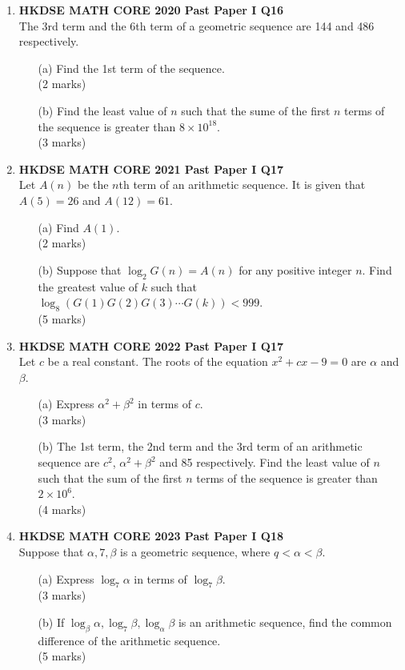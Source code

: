 \documentclass[12pt]{article}
\begin{document}
\begin{enumerate}
    \item \textbf{HKDSE MATH CORE 2020 Past Paper I Q16}\\
	The 3rd term and the 6th term of a geometric sequence are 144 and 486 respectively.
	\begin{enumerate}
		\item[(a)] Find the 1st term of the sequence. \\(2 marks) 
		\item[(b)] Find the least value of $n$ such that the sume of the first $n$ terms of the sequence is greater than $8 \times 10^{18}$. \\(3 marks)
	\end{enumerate}

    \item \textbf{HKDSE MATH CORE 2021 Past Paper I Q17}\\
	Let $A(n)$ be the $n$th term of an arithmetic sequence. It is given that $A(5) = 26$ and $A(12) = 61$.
	\begin{enumerate}
		\item[(a)] Find $A(1)$. \\(2 marks)
		\item[(b)] Suppose that $\log_2{G(n)} = A(n)$ for any positive integer $n$. Find the greatest value of $k$ such that $\log_8{\left(G(1)G(2)G(3)\cdots G(k)\right) < 999}$. \\(5 marks)
	\end{enumerate}

    \item \textbf{HKDSE MATH CORE 2022 Past Paper I Q17}\\
	Let $c$ be a real constant. The roots of the equation $x^2 + cx - 9 = 0$ are $\alpha$ and $\beta$.
	\begin{enumerate}
		\item[(a)] Express $\alpha^2 + \beta^2$ in terms of $c$. \\(3 marks)
		\item[(b)] The 1st term, the 2nd term and the 3rd term of an arithmetic sequence are $c^2$, $\alpha^2 + \beta^2$ and 85 respectively. Find the least value of $n$ such that the sum of the first $n$ terms of the sequence is greater than $2 \times 10^6$. \\(4 marks)
	\end{enumerate}

    \item \textbf{HKDSE MATH CORE 2023 Past Paper I Q18}\\
	Suppose that $\alpha , 7 , \beta $ is a geometric sequence, where $q < \alpha < \beta$.
	\begin{enumerate}
		\item[(a)] Express $\log_7{\alpha}$ in terms of $\log_7{\beta}$. \\(3 marks)
		\item[(b)] If $\log_{\beta}{\alpha}, \log_{7}{\beta}, \log_{\alpha}{\beta}$ is an arithmetic sequence, find the common difference of the arithmetic sequence. \\(5 marks)
	\end{enumerate}


\end{enumerate}
\end{document}
